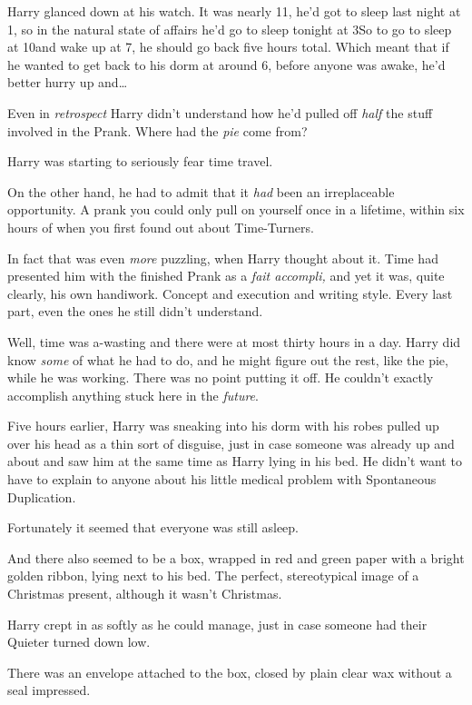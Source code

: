 Harry glanced down at his watch. It was nearly 11\am, he’d got to sleep last night at 1\am, so in the natural state of affairs he’d go to sleep tonight at 3\am So to go to sleep at 10\pm and wake up at 7\am, he should go back five hours total. Which meant that if he wanted to get back to his dorm at around 6\am, before anyone was awake, he’d better hurry up and…

Even in \emph{retrospect} Harry didn’t understand how he’d pulled off \emph{half} the stuff involved in the Prank. Where had the \emph{pie} come from?

Harry was starting to seriously fear time travel.

On the other hand, he had to admit that it \emph{had} been an irreplaceable opportunity. A prank you could only pull on yourself once in a lifetime, within six hours of when you first found out about Time-Turners.

In fact that was even \emph{more} puzzling, when Harry thought about it. Time had presented him with the finished Prank as a \emph{fait accompli,} and yet it was, quite clearly, his own handiwork. Concept and execution and writing style. Every last part, even the ones he still didn’t understand.

Well, time was a-wasting and there were at most thirty hours in a day. Harry did know \emph{some} of what he had to do, and he might figure out the rest, like the pie, while he was working. There was no point putting it off. He couldn’t exactly accomplish anything stuck here in the \emph{future}.

\later

Five hours earlier, Harry was sneaking into his dorm with his robes pulled up over his head as a thin sort of disguise, just in case someone was already up and about and saw him at the same time as Harry lying in his bed. He didn’t want to have to explain to anyone about his little medical problem with Spontaneous Duplication.

Fortunately it seemed that everyone was still asleep.

And there also seemed to be a box, wrapped in red and green paper with a bright golden ribbon, lying next to his bed. The perfect, stereotypical image of a Christmas present, although it wasn’t Christmas.

Harry crept in as softly as he could manage, just in case someone had their Quieter turned down low.

There was an envelope attached to the box, closed by plain clear wax without a seal impressed.

